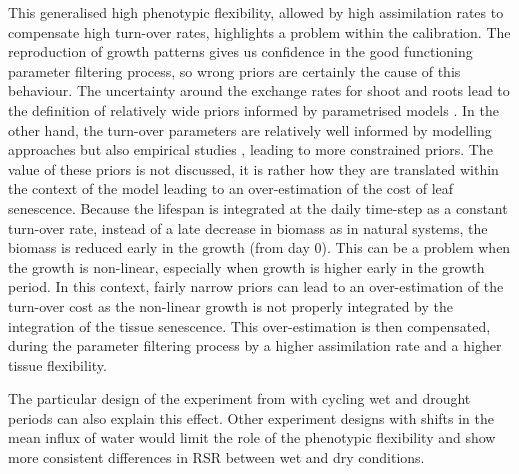 This generalised high phenotypic flexibility, allowed by high assimilation rates to compensate high turn-over rates, highlights a problem within the calibration. The reproduction of growth patterns gives us confidence in the good functioning parameter filtering process, so wrong priors are certainly the cause of this behaviour. The uncertainty around the exchange rates for shoot and roots lead to the definition of relatively wide priors informed by parametrised models \parencite{kleidon_global_2000, reineking_environmental_2006, taubert_modelling_2014}. In the other hand, the turn-over parameters are relatively well informed by modelling approaches but also empirical studies \parencite{ ryser_ecological_2000, wright_worldwide_2004, tjoelker_linking_2005,  luke_mccormack_predicting_2012}, leading to more constrained priors. The value of these priors is not discussed, it is rather how they are translated within the context of the model leading to an over-estimation of the cost of leaf senescence. Because the lifespan is integrated at the daily time-step as a constant turn-over rate, instead of a late decrease in biomass as in natural systems, the biomass is reduced early in the growth (from day 0). This can be a problem when the growth is non-linear, especially when growth is higher early in the growth period. In this context, fairly narrow priors can lead to an over-estimation of the turn-over cost as the non-linear growth is not properly integrated by the integration of the tissue senescence. This over-estimation is then compensated, during the parameter filtering process by a higher assimilation rate and a higher tissue flexibility.

The particular design of the experiment from \citet{peterson_growth_1982} with cycling wet and drought periods can also explain this effect. Other experiment designs with shifts in the mean influx of water would limit the role of the phenotypic flexibility and show more consistent differences in RSR between wet and dry conditions.


